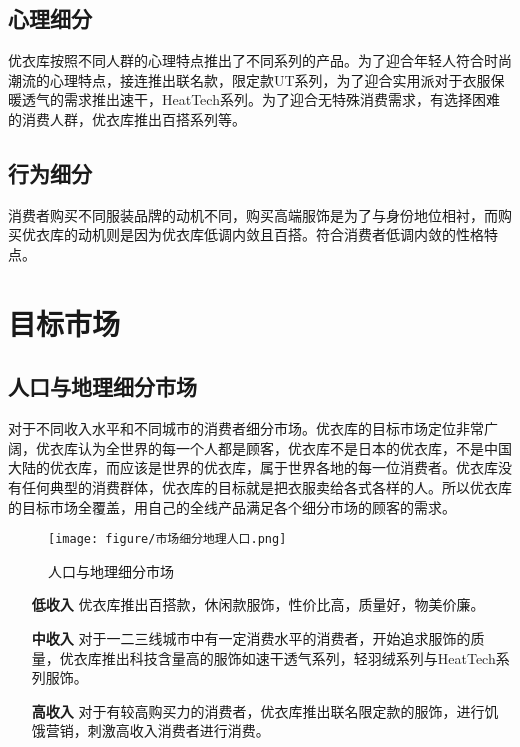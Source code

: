 \documentclass{xjtureport}
\begin{document}
\subsection{心理细分}
优衣库按照不同人群的心理特点推出了不同系列的产品。为了迎合年轻人符合时尚潮流的心理特点，接连推出联名款，限定款UT系列，为了迎合实用派对于衣服保暖透气的需求推出速干，HeatTech系列。为了迎合无特殊消费需求，有选择困难的消费人群，优衣库推出百搭系列等。
\subsection{行为细分}
消费者购买不同服装品牌的动机不同，购买高端服饰是为了与身份地位相衬，而购买优衣库的动机则是因为优衣库低调内敛且百搭。符合消费者低调内敛的性格特点。
\section{目标市场}
\subsection{人口与地理细分市场}
对于不同收入水平和不同城市的消费者细分市场。优衣库的目标市场定位非常广阔，优衣库认为全世界的每一个人都是顾客，优衣库不是日本的优衣库，不是中国大陆的优衣库，而应该是世界的优衣库，属于世界各地的每一位消费者。优衣库没有任何典型的消费群体，优衣库的目标就是把衣服卖给各式各样的人。所以优衣库的目标市场全覆盖，用自己的全线产品满足各个细分市场的顾客的需求。
\begin{figure}[H]
    \centering
    \texttt{[image: figure/市场细分地理人口.png]}
    \caption{人口与地理细分市场}
\end{figure}
\begin{itemize}
    \item[\textbf{低收入}] 优衣库推出百搭款，休闲款服饰，性价比高，质量好，物美价廉。
    \item[\textbf{中收入}] 对于一二三线城市中有一定消费水平的消费者，开始追求服饰的质量，优衣库推出科技含量高的服饰如速干透气系列，轻羽绒系列与HeatTech系列服饰。
    \item[\textbf{高收入}] 对于有较高购买力的消费者，优衣库推出联名限定款的服饰，进行饥饿营销，刺激高收入消费者进行消费。  
\end{itemize}
\end{document}

